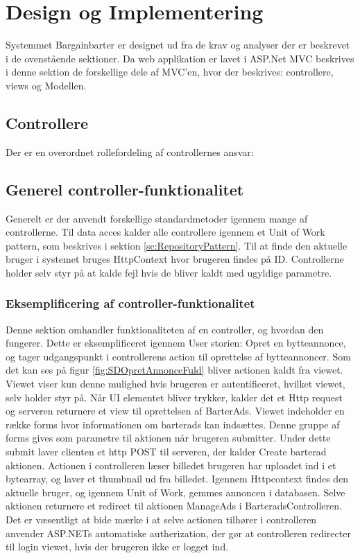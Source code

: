 \chapter{Design og Implementering}
Systemmet Bargainbarter er designet ud fra de krav og analyser der er beskrevet i de ovenstående sektioner. Da web applikation er lavet i ASP.Net MVC beskrives i denne sektion de forskellige dele af MVC'en, hvor der beskrives: controllere, views og Modellen. 


\section{Controllere}
Der er en overordnet rollefordeling af controllernes ansvar: 



\section{Generel controller-funktionalitet}

Generelt er der anvendt forskellige standardmetoder igennem mange af controllerne. Til data acces kalder alle controllere igennem et Unit of Work pattern, som beskrives i sektion \ref{sc:RepositoryPattern}. Til at finde den aktuelle bruger i systemet bruges HttpContext hvor brugeren findes på ID. Controllerne holder selv styr på at kalde fejl hvis de bliver kaldt med ugyldige parametre.

\subsection{Eksemplificering af controller-funktionalitet}
Denne sektion omhandler funktionaliteten af en controller, og hvordan den fungerer. Dette er eksemplificeret igennem User storien: Opret en bytteannonce, og tager udgangspunkt i controllerens action til oprettelse af bytteannoncer.
Som det kan ses på figur \ref{fig:SDOpretAnnonceFuld} bliver actionen kaldt fra viewet. Viewet viser kun denne mulighed hvis brugeren er autentificeret, hvilket viewet, selv holder styr på. Når UI elementet bliver trykker, kalder det et Http request og serveren returnere et view til oprettelsen af BarterAds. Viewet indeholder en række forms hvor informationen om barterads kan indsættes. Denne gruppe af forms gives som parametre til aktionen når brugeren submitter. Under dette submit laver clienten et http POST til serveren, der kalder Create barterad aktionen. Actionen i controlleren læser billedet brugeren har uploadet ind i et bytearray, og laver et thumbnail ud fra billedet. Igennem Httpcontext findes den aktuelle bruger, og igennem Unit of Work, gemmes annoncen i databasen. Selve aktionen returnere et redirect til aktionen ManageAds i BarteradsControlleren. Det er væsentligt at bide mærke i at selve actionen tilhører i controlleren anvender ASP.NETs automatiske autherization, der gør at controlleren redirecter til login viewet, hvis der brugeren ikke er logget ind.


